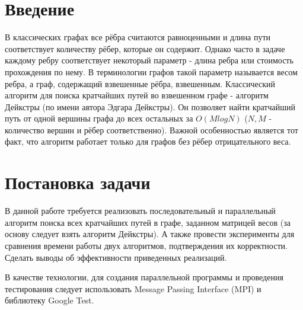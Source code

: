 \documentclass{report}
\begin{document}
\setcounter{page}{2}

\tableofcontents
\newpage

\section*{Введение}
\par В классических графах все рёбра считаются равноценными и длина пути соответствует количеству рёбер, которые он содержит. Однако часто в задаче каждому ребру соответствует некоторый параметр - длина ребра или стоимость прохождения по нему. В терминологии графов такой параметр называется весом ребра, а граф, содержащий взвешенные рёбра, взвешенным. Классический алгоритм для поиска кратчайших путей во взвешенном графе - алгоритм Дейкстры (по имени автора Эдгара Дейкстры). Он позволяет найти кратчайший путь от одной вершины графа до всех остальных за $O(MlogN)$ ($N,M$ - количество вершин и рёбер соответственно). Важной особенностью является тот факт, что алгоритм работает только для графов без рёбер отрицательного веса.

\newpage

\section*{Постановка задачи}
\par В данной работе требуется реализовать последовательный и параллельный алгоритм поиска всех кратчайших путей в графе, заданном матрицей весов (за основу следует взять алгоритм Дейкстры). А также провести эксперименты для сравнения времени работы двух алгоритмов, подтверждения их корректности. Сделать выводы об эффективности приведенных реализаций.
\par В качестве технологии, для создания параллельной программы и проведения тестирования следует использовать Message Passing Interface (MPI) и библиотеку Google Test.

\newpage

\end{document}
